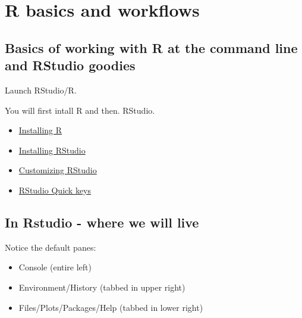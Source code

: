\documentclass[
]{book}
\providecommand{\tightlist}{%
  \setlength{\itemsep}{0pt}\setlength{\parskip}{0pt}}
\begin{document}
\hypertarget{r-basics}{%
\chapter{R basics and workflows}\label{r-basics}}

\hypertarget{basics-of-working-with-r-at-the-command-line-and-rstudio-goodies}{%
\section{Basics of working with R at the command line and RStudio goodies}\label{basics-of-working-with-r-at-the-command-line-and-rstudio-goodies}}

Launch RStudio/R.

You will first intall R and then. RStudio.

\begin{itemize}
\item
  \href{https://cran.case.edu/}{Installing R}
\item
  \href{https://www.rstudio.com/products/rstudio/download/}{Installing RStudio}
\item
  \href{https://support.rstudio.com/hc/en-us/articles/200549016-Customizing-the-RStudio-IDE}{Customizing RStudio}
\item
  \href{https://support.rstudio.com/hc/en-us/articles/200711853-Keyboard-Shortcuts-in-the-RStudio-IDE}{RStudio Quick keys}
\end{itemize}

\hypertarget{in-rstudio---where-we-will-live}{%
\section{In Rstudio - where we will live}\label{in-rstudio---where-we-will-live}}

Notice the default panes:

\begin{itemize}
\tightlist
\item
  Console (entire left)
\item
  Environment/History (tabbed in upper right)
\item
  Files/Plots/Packages/Help (tabbed in lower right)
\end{itemize}

\hypertarget{section}{%
\section{}\label{section}}
\end{document}
